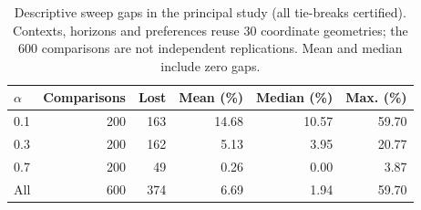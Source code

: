 \begin{table}[tb]
\centering
\caption{Descriptive sweep gaps in the principal study (all tie-breaks certified). Contexts, horizons and preferences reuse 30 coordinate geometries; the 600 comparisons are not independent replications. Mean and median include zero gaps.}
\label{tab:minimax-audit-v11}
\scriptsize\setlength{\tabcolsep}{4pt}
\begin{tabular}{@{}lrrrrr@{}}
\toprule
$\alpha$ & Comparisons & Lost & Mean (\%) & Median (\%) & Max. (\%)\\\midrule
0.1 & 200 & 163 & 14.68 & 10.57 & 59.70 \\
0.3 & 200 & 162 & 5.13 & 3.95 & 20.77 \\
0.7 & 200 & 49 & 0.26 & 0.00 & 3.87 \\
All & 600 & 374 & 6.69 & 1.94 & 59.70 \\
\bottomrule
\end{tabular}
\end{table}
